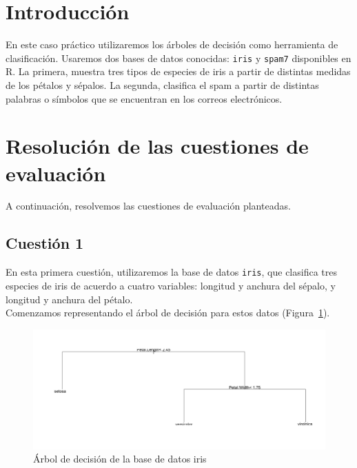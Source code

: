 \documentclass[12pt,a4paper,twoside,openright,titlepage,final]{article}
\author{José Ignacio Escribano}
\title{}
\begin{document}
\setcounter{page}{1}


\listoffigures
\thispagestyle{empty}
\newpage

\tableofcontents
\thispagestyle{empty}
\newpage


\setcounter{page}{1}

\section{Introducción}

En este caso práctico utilizaremos los árboles de decisión como herramienta de clasificación. Usaremos dos bases de datos conocidas: \texttt{iris} y \texttt{spam7} disponibles en R. La primera, muestra tres tipos de especies de iris a partir de distintas medidas de los pétalos y sépalos. La segunda, clasifica el spam a partir de distintas palabras o símbolos que se encuentran en los correos electrónicos.

\section{Resolución de las cuestiones de evaluación}

A continuación, resolvemos las cuestiones de evaluación planteadas.

\subsection{Cuestión 1}

En esta primera cuestión, utilizaremos la base de datos \texttt{iris}, que clasifica tres especies de iris de acuerdo a cuatro variables: longitud y anchura del sépalo, y longitud y anchura del pétalo.\\

Comenzamos representando el árbol de decisión para estos datos (Figura~\ref{fig:iris_sin_podar}).\\

\begin{figure}[tbph!]
\centering
\includegraphics[width=0.9\linewidth]{imagenes/iris_sin_podar}
\caption{Árbol de decisión de la base de datos iris}
\label{fig:iris_sin_podar}
\end{figure}
\end{document}
